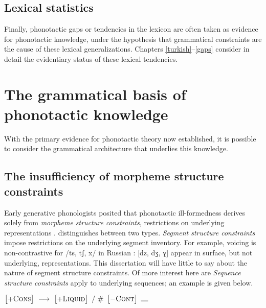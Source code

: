 \subsection{Lexical statistics}

Finally, phonotactic gaps or tendencies in the lexicon are often taken as evidence for phonotactic knowledge, under the hypothesis that grammatical constraints are the cause of these lexical generalizations.
Chapters \ref{turkish}--\ref{gaps} consider in detail the evidentiary status of these lexical tendencies.

\section{The grammatical basis of phonotactic knowledge}

With the primary evidence for phonotactic theory now established, it is possible to consider the grammatical architecture that underlies this knowledge.

\subsection{The insufficiency of morpheme structure constraints}

Early generative phonologists posited that phonotactic ill-formedness derives solely from \emph{morpheme structure constraints}, restrictions on underlying representations \citep{Chomsky1965,SPE,SPR,Halle1962}.
\citet{Stanley1967} distinguishes between two types.
\emph{Segment structure constraints} impose restrictions on the underlying segment inventory.
For example, voicing is non-contrastive for /ts, tʃ, x/ in Russian \cite[22]{SPR}: [dz, dʒ, ɣ] appear in surface, but not underlying, representations.
This dissertation will have little to say about the nature of segment structure constraints.
Of more interest here are \emph{Sequence structure constraints} apply to underlying sequences; an example is given below.

\begin{example}
$\begin{bmatrix} +\textsc{Cons} \end{bmatrix}~\goesto~\begin{bmatrix} +\textsc{Liquid} \end{bmatrix}~/~\#~\begin{bmatrix} -\textsc{Cont} \end{bmatrix}~\gap$
\end{example}

